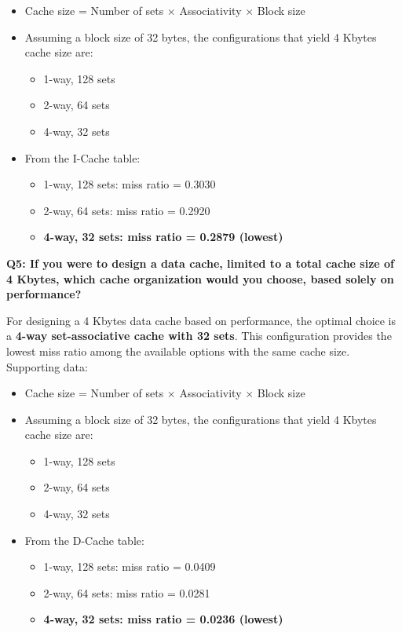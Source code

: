 \documentclass{article}
\begin{document}
\begin{itemize}
	\item Cache size = Number of sets $\times$ Associativity $\times$ Block size
	\item Assuming a block size of 32 bytes, the configurations that yield 4 Kbytes cache size are:
	\begin{itemize}
		\item 1-way, 128 sets
		\item 2-way, 64 sets
		\item 4-way, 32 sets
	\end{itemize}
	\item From the I-Cache table:
	\begin{itemize}
		\item 1-way, 128 sets: miss ratio = 0.3030
		\item 2-way, 64 sets: miss ratio = 0.2920
		\item \textbf{4-way, 32 sets: miss ratio = 0.2879 (lowest)}
	\end{itemize}
\end{itemize}

\textbf{Q5: If you were to design a data cache, limited to a total cache size of 4 Kbytes, which cache organization would you choose, based solely on performance?}

For designing a 4 Kbytes data cache based on performance, the optimal choice is a \textbf{4-way set-associative cache with 32 sets}. This configuration provides the lowest miss ratio among the available options with the same cache size. Supporting data:

\begin{itemize}
	\item Cache size = Number of sets $\times$ Associativity $\times$ Block size
	\item Assuming a block size of 32 bytes, the configurations that yield 4 Kbytes cache size are:
	\begin{itemize}
		\item 1-way, 128 sets
		\item 2-way, 64 sets
		\item 4-way, 32 sets
	\end{itemize}
	\item From the D-Cache table:
	\begin{itemize}
		\item 1-way, 128 sets: miss ratio = 0.0409
		\item 2-way, 64 sets: miss ratio = 0.0281
		\item \textbf{4-way, 32 sets: miss ratio = 0.0236 (lowest)}
	\end{itemize}
\end{itemize}
\end{document}
